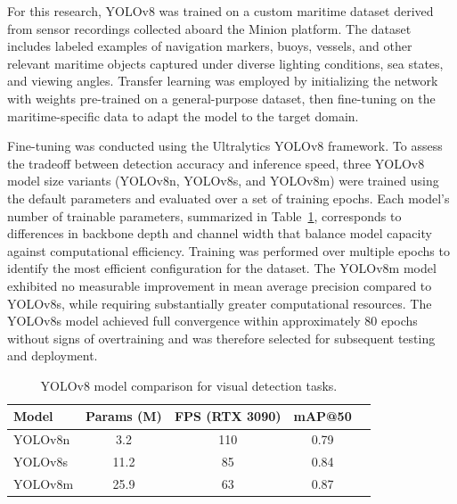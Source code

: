 \documentclass[../main.tex]{subfiles}
\begin{document}

For this research, YOLOv8 was trained on a custom maritime dataset derived from sensor recordings collected aboard the Minion platform.
The dataset includes labeled examples of navigation markers, buoys, vessels, and other relevant maritime objects captured under diverse lighting conditions, sea states, and viewing angles.
Transfer learning was employed by initializing the network with weights pre-trained on a general-purpose dataset, then fine-tuning on the maritime-specific data to adapt the model to the target domain.

Fine-tuning was conducted using the Ultralytics YOLOv8 framework. \cite{ultralytics} %
To assess the tradeoff between detection accuracy and inference speed, three YOLOv8 model size variants (YOLOv8n, YOLOv8s, and YOLOv8m) were trained using the default parameters and evaluated over a set of training epochs.
Each model’s number of trainable parameters, summarized in Table~\ref{tab:yolo_variants}, corresponds to differences in backbone depth and channel width that balance model capacity against computational efficiency.
Training was performed over multiple epochs to identify the most efficient configuration for the dataset.
The YOLOv8m model exhibited no measurable improvement in mean average precision compared to YOLOv8s, while requiring substantially greater computational resources.
The YOLOv8s model achieved full convergence within approximately 80 epochs without signs of overtraining and was therefore selected for subsequent testing and deployment.

\begin{table}[htbp]
\centering
\caption{YOLOv8 model comparison for visual detection tasks.}
\begin{tabular}{l c c c c}
\hline
Model & Params (M) & FPS (RTX 3090) & mAP@50 \\
\hline
YOLOv8n & 3.2 &  110 & 0.79 \\
YOLOv8s & 11.2 &  85 & 0.84 \\
YOLOv8m & 25.9 &  63 & 0.87 \\
\hline
\end{tabular}
\label{tab:yolo_variants}
\end{table}
\end{document}

